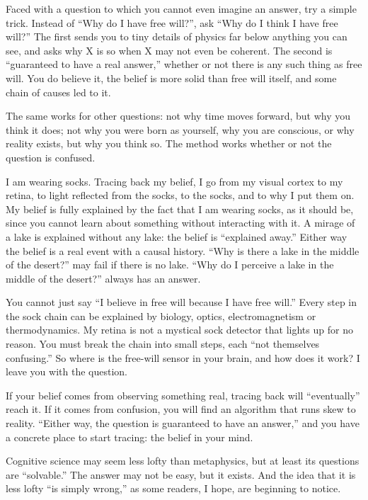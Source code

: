 
Faced with a question to which you cannot even imagine an answer, try a simple trick. Instead of ``Why do I have free will?'', ask ``Why do I think I have free will?'' The first sends you to tiny details of physics far below anything you can see, and asks why X is so when X may not even be coherent. The second is ``guaranteed to have a real answer,'' whether or not there is any such thing as free will. You do believe it, the belief is more solid than free will itself, and some chain of causes led to it. 

The same works for other questions: not why time moves forward, but why you think it does; not why you were born as yourself, why you are conscious, or why reality exists, but why you think so. The method works whether or not the question is confused. 

I am wearing socks. Tracing back my belief, I go from my visual cortex to my retina, to light reflected from the socks, to the socks, and to why I put them on. My belief is fully explained by the fact that I am wearing socks, as it should be, since you cannot learn about something without interacting with it. A mirage of a lake is explained without any lake: the belief is ``explained away.'' Either way the belief is a real event with a causal history. ``Why is there a lake in the middle of the desert?'' may fail if there is no lake. ``Why do I perceive a lake in the middle of the desert?'' always has an answer.

You cannot just say ``I believe in free will because I have free will.'' Every step in the sock chain can be explained by biology, optics, electromagnetism or thermodynamics. My retina is not a mystical sock detector that lights up for no reason. You must break the chain into small steps, each ``not themselves confusing.'' So where is the free-will sensor in your brain, and how does it work? I leave you with the question.

If your belief comes from observing something real, tracing back will ``eventually'' reach it. If it comes from confusion, you will find an algorithm that runs skew to reality. ``Either way, the question is guaranteed to have an answer,'' and you have a concrete place to start tracing: the belief in your mind.

Cognitive science may seem less lofty than metaphysics, but at least its questions are ``solvable.'' The answer may not be easy, but it exists. And the idea that it is less lofty ``is simply wrong,'' as some readers, I hope, are beginning to notice.
